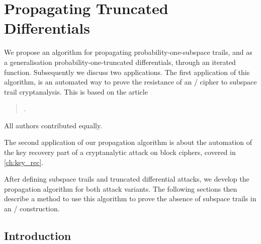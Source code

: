\chapter{Propagating Truncated Differentials}\label{ch:st}

\hspace{1.5em}
We propose an algorithm for propagating probability-one-subspace trails, and as a generalisation probability-one-truncated differentials, through an iterated function.
Subsequently we discuss two applications.
The first application of this algorithm, is an automated way to prove the resistance of an \SPN/ cipher to subspace trail cryptanalysis.
This is based on the article
\begin{quote}
    .
\end{quote}
All authors contributed equally.

The second application of our propagation algorithm is about the automation of the key recovery part of a cryptanalytic attack on block ciphers, covered in \cref{ch:key_rec}.

After defining subspace trails and truncated differential attacks, we develop the propagation algorithm for both attack variants.
The following sections then describe a method to use this algorithm to prove the absence of subspace trails in an \SPN/ construction.

\section{Introduction}


